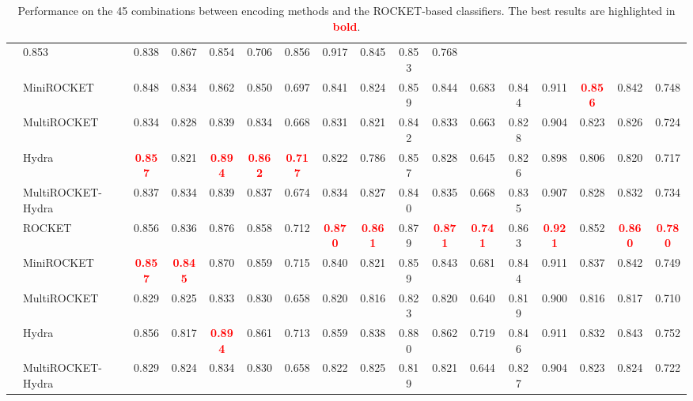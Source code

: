 \begin{table}[tbp]
{\begin{tabular}{llccccc|ccccc|ccccc}
              & 0.853 & 0.838 & 0.867 & 0.854 & 0.706  
              & 0.856 & 0.917 & 0.845 & 0.853 & 0.768 \\
              & MiniROCKET 
              & 0.848 & 0.834 & 0.862 & 0.850 & 0.697  
              & 0.841 & 0.824 & 0.859 & 0.844 & 0.683  
              & 0.844 & 0.911 & \textcolor{red}{\textbf{0.856}} & 0.842 & 0.748 \\
              & MultiROCKET
              & 0.834 & 0.828 & 0.839 & 0.834 & 0.668  
              & 0.831 & 0.821 & 0.842 & 0.833 & 0.663  
              & 0.828 & 0.904 & 0.823 & 0.826 & 0.724 \\
              & Hydra
              & \textcolor{red}{\textbf{0.857}} & 0.821 & \textcolor{red}{\textbf{0.894}} & \textcolor{red}{\textbf{0.862}} & \textcolor{red}{\textbf{0.717}}  
              & 0.822 & 0.786 & 0.857 & 0.828 & 0.645  
              & 0.826 & 0.898 & 0.806 & 0.820 & 0.717 \\
              & MultiROCKET-Hydra
              & 0.837 & 0.834 & 0.839 & 0.837 & 0.674  
              & 0.834 & 0.827 & 0.840 & 0.835 & 0.668  
              & 0.835 & 0.907 & 0.828 & 0.832 & 0.734 \\
\midrule
{} 
              & ROCKET  
              & 0.856 & 0.836 & 0.876 & 0.858 & 0.712  
              & \textcolor{red}{\textbf{0.870}} & \textcolor{red}{\textbf{0.861}} & 0.879 & \textcolor{red}{\textbf{0.871}} & \textcolor{red}{\textbf{0.741}}  
              & 0.863 & \textcolor{red}{\textbf{0.921}} & 0.852 & \textcolor{red}{\textbf{0.860}} & \textcolor{red}{\textbf{0.780}} \\
              & MiniROCKET 
              & \textcolor{red}{\textbf{0.857}} & \textcolor{red}{\textbf{0.845}} & 0.870 & 0.859 & 0.715  
              & 0.840 & 0.821 & 0.859 & 0.843 & 0.681  
              & 0.844 & 0.911 & 0.837 & 0.842 & 0.749 \\
              & MultiROCKET
              & 0.829 & 0.825 & 0.833 & 0.830 & 0.658  
              & 0.820 & 0.816 & 0.823 & 0.820 & 0.640  
              & 0.819 & 0.900 & 0.816 & 0.817 & 0.710 \\
              & Hydra
              & 0.856 & 0.817 & \textcolor{red}{\textbf{0.894}} & 0.861 & 0.713  
              & 0.859 & 0.838 & 0.880 & 0.862 & 0.719  
              & 0.846 & 0.911 & 0.832 & 0.843 & 0.752 \\
              & MultiROCKET-Hydra
              & 0.829 & 0.824 & 0.834 & 0.830 & 0.658  
              & 0.822 & 0.825 & 0.819 & 0.821 & 0.644  
              & 0.827 & 0.904 & 0.823 & 0.824 & 0.722 \\
\bottomrule
\end{tabular}}
\caption{Performance on the 45 combinations between encoding methods and the ROCKET-based classifiers. The best results are highlighted in \textcolor{red}{\textbf{bold}}.}
\label{tab:results}
\end{table}